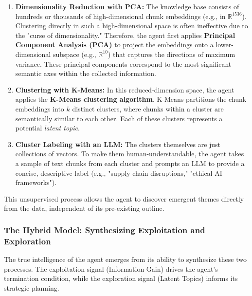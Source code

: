 \documentclass[12pt, a4paper]{article}
\begin{document}
\begin{enumerate}
    \item \textbf{Dimensionality Reduction with PCA:} The knowledge base consists of hundreds or thousands of high-dimensional chunk embeddings (e.g., in $\mathbb{R}^{1536}$). Clustering directly in such a high-dimensional space is often ineffective due to the "curse of dimensionality." Therefore, the agent first applies \textbf{Principal Component Analysis (PCA)} to project the embeddings onto a lower-dimensional subspace (e.g., $\mathbb{R}^{10}$) that captures the directions of maximum variance. These principal components correspond to the most significant semantic axes within the collected information.

    \item \textbf{Clustering with K-Means:} In this reduced-dimension space, the agent applies the \textbf{K-Means clustering algorithm}. K-Means partitions the chunk embeddings into $k$ distinct clusters, where chunks within a cluster are semantically similar to each other. Each of these clusters represents a potential \textit{latent topic}.

    \item \textbf{Cluster Labeling with an LLM:} The clusters themselves are just collections of vectors. To make them human-understandable, the agent takes a sample of text chunks from each cluster and prompts an LLM to provide a concise, descriptive label (e.g., "supply chain disruptions," "ethical AI frameworks").
\end{enumerate}

This unsupervised process allows the agent to discover emergent themes directly from the data, independent of its pre-existing outline.

\subsubsection{The Hybrid Model: Synthesizing Exploitation and Exploration}

The true intelligence of the agent emerges from its ability to synthesize these two processes. The exploitation signal (Information Gain) drives the agent's termination condition, while the exploration signal (Latent Topics) informs its strategic planning.
\end{document}
